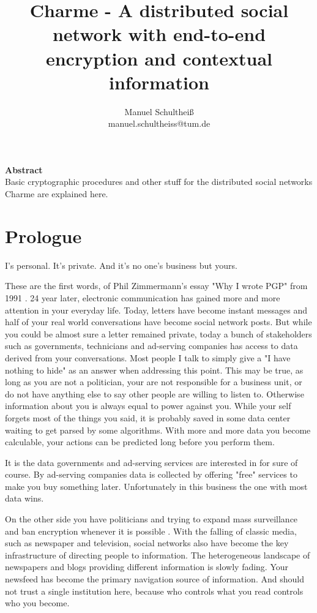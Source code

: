\documentclass{scrartcl}
\title{Charme - A distributed social network with end-to-end encryption and contextual information}
\author{Manuel Schultheiß\\manuel.schultheiss@tum.de}
\begin{document}
  \sloppy %
 
\maketitle
\textbf{Abstract}\\
Basic cryptographic procedures and other stuff for the distributed social networks Charme are explained here.

\tableofcontents
 \newpage
\section{Prologue}

\begin{center}
I's personal. It's private.
And it's no one's business but yours.
\end{center}

These are the first words, of Phil Zimmermann's essay "Why I wrote PGP" from 1991 \cite{PHIL}. 24 year later, electronic communication has gained more and more attention in your everyday life. Today, letters have become instant messages and half of your real world conversations have become social network posts. But while you could be almost sure a letter remained private, today a bunch of stakeholders such as governments, technicians and ad-serving companies has access to data derived from your conversations. 
Most people I talk to simply give a "I have nothing to hide" as an answer when addressing this point. This may be true, as long as you are not a politician, your are not responsible for a business unit, or do not have anything else to say other people are willing to listen to. Otherwise information about you is always equal to power against you. While your self forgets most of the things you said, it is probably saved in some data center waiting to get parsed by some algorithms. With more and more data you become calculable, your actions can be predicted long before you perform them.

 It is the data governments and ad-serving services are interested in for sure of course. By ad-serving companies data is collected by offering "free" services  to make you buy something later. Unfortunately in this business the one with most data wins.

On the other side you have politicians and trying to expand mass surveillance and ban encryption whenever it is possible \cite{EFF}. With the falling of classic media, such as newspaper and television, social networks also have become the key infrastructure of directing people to information. The heterogeneous  landscape of newspapers and blogs providing different information is slowly fading. Your newsfeed has become the primary navigation source of information. And should not trust a single institution  here, because who controls what you read controls who you become.
\end{document}
